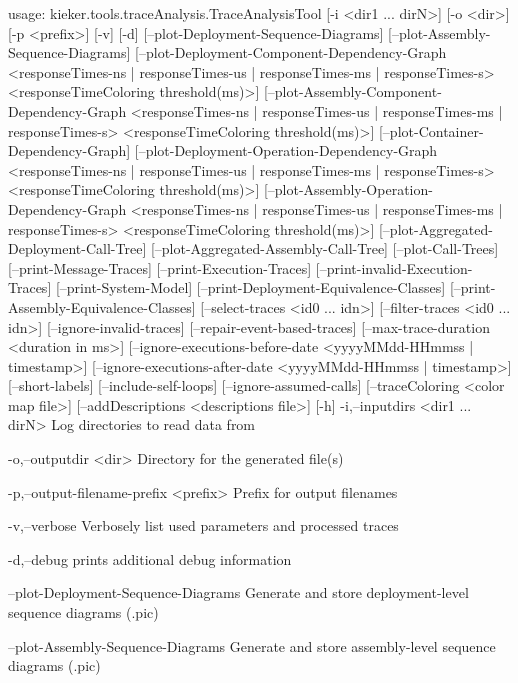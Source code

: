 usage: kieker.tools.traceAnalysis.TraceAnalysisTool [-i <dir1 ... dirN>]
       [-o <dir>] [-p <prefix>] [-v] [-d]
       [--plot-Deployment-Sequence-Diagrams]
       [--plot-Assembly-Sequence-Diagrams]
       [--plot-Deployment-Component-Dependency-Graph <responseTimes-ns |
       responseTimes-us | responseTimes-ms | responseTimes-s>
       <responseTimeColoring threshold(ms)>]
       [--plot-Assembly-Component-Dependency-Graph <responseTimes-ns |
       responseTimes-us | responseTimes-ms | responseTimes-s>
       <responseTimeColoring threshold(ms)>]
       [--plot-Container-Dependency-Graph]
       [--plot-Deployment-Operation-Dependency-Graph <responseTimes-ns |
       responseTimes-us | responseTimes-ms | responseTimes-s>
       <responseTimeColoring threshold(ms)>]
       [--plot-Assembly-Operation-Dependency-Graph <responseTimes-ns |
       responseTimes-us | responseTimes-ms | responseTimes-s>
       <responseTimeColoring threshold(ms)>]
       [--plot-Aggregated-Deployment-Call-Tree]
       [--plot-Aggregated-Assembly-Call-Tree] [--plot-Call-Trees]
       [--print-Message-Traces] [--print-Execution-Traces]
       [--print-invalid-Execution-Traces] [--print-System-Model]
       [--print-Deployment-Equivalence-Classes]
       [--print-Assembly-Equivalence-Classes] [--select-traces <id0 ...
       idn>] [--filter-traces <id0 ... idn>] [--ignore-invalid-traces]
       [--repair-event-based-traces] [--max-trace-duration <duration in
       ms>] [--ignore-executions-before-date <yyyyMMdd-HHmmss |
       timestamp>] [--ignore-executions-after-date <yyyyMMdd-HHmmss |
       timestamp>] [--short-labels] [--include-self-loops]
       [--ignore-assumed-calls] [--traceColoring <color map file>]
       [--addDescriptions <descriptions file>] [-h]
 -i,--inputdirs <dir1 ... dirN>
        Log directories to read data from

 -o,--outputdir <dir>
        Directory for the generated file(s)

 -p,--output-filename-prefix <prefix>
        Prefix for output filenames
        

 -v,--verbose
        Verbosely list used parameters and processed traces

 -d,--debug
        prints additional debug information

    --plot-Deployment-Sequence-Diagrams
        Generate and store deployment-level sequence diagrams (.pic)

    --plot-Assembly-Sequence-Diagrams
        Generate and store assembly-level sequence diagrams (.pic)

